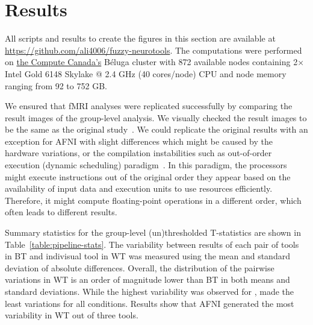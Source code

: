\documentclass[conference]{IEEEtran}
\begin{document}
\section{Results}
All scripts and results to create the figures in this section are available at \url{https://github.com/ali4006/fuzzy-neurotools}.
The computations were performed on \href{https://www.computecanada.ca}{the Compute Canada's} Béluga cluster
with 872 available nodes containing 2× Intel Gold 6148 Skylake @ 2.4 GHz (40 cores/node) CPU and node memory ranging from 92 to 752 GB.

We ensured that fMRI analyses were replicated successfully by comparing the result images of the group-level analysis.
We visually checked the result images to be the same as the original study~\cite{bowring2019exploring}.
We could replicate the original results with an exception for AFNI with slight differences which might be caused by the hardware variations,
or the compilation instabilities such as out-of-order execution (dynamic scheduling) paradigm~\cite{duben2014use,demmel2013numerical}.
In this paradigm, the processors might execute instructions out of the original order they appear based on
the availability of input data and execution units to use resources efficiently. Therefore, it might
compute floating-point operations in a different order, which often leads to different results.

Summary statistics for the group-level (un)thresholded T-statistics are shown in Table~\ref{table:pipeline-stats}.
The variability between results of each pair of tools in BT and indivisual tool in WT was measured using the mean and standard deviation of absolute differences.
Overall, the distribution of the pairwise variations in WT is an order of magnitude lower than BT in both means and standard deviations.
While the highest variability was observed for \fslafni, \fslspm made the least variations for all conditions.
Results show that AFNI generated the most variability in WT out of three tools.
\end{document}

